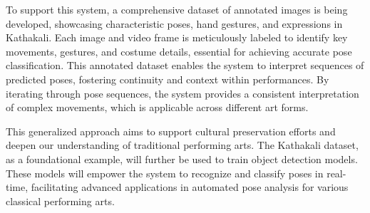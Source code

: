 \documentclass[12pt,a4wide]{report}
\theoremstyle{plain}
\theoremstyle{definition}
\theoremstyle{remark}
\begin{document}
To support this system, a comprehensive dataset of annotated images is being developed, showcasing characteristic poses, hand gestures, and expressions in Kathakali. Each image and video frame is meticulously labeled to identify key movements, gestures, and costume details, essential for achieving accurate pose classification. This annotated dataset enables the system to interpret sequences of predicted poses, fostering continuity and context within performances. By iterating through pose sequences, the system provides a consistent interpretation of complex movements, which is applicable across different art forms.

This generalized approach aims to support cultural preservation efforts and deepen our understanding of traditional performing arts. The Kathakali dataset, as a foundational example, will further be used to train object detection models. These models will empower the system to recognize and classify poses in real-time, facilitating advanced applications in automated pose analysis for various classical performing arts.


\clearpage



\tableofcontents
\clearpage
\listoffigures
\listoftables


\newpage

\setcounter{page}{1}








% 



\nocite{bulani2022framework} \nocite{cheng2020higherhrnet}\nocite{haridas2022detection}\nocite{lee2022deep}
\nocite{shen2024application}
\nocite{tompson2015efficient}
\nocite{wang2022application}
\nocite{wei2016convolutional}
\nocite{youtube2024kathakali1}
\nocite{youtube2024kathakali2}
\nocite{youtube2024kathakali3}


\end{document}
